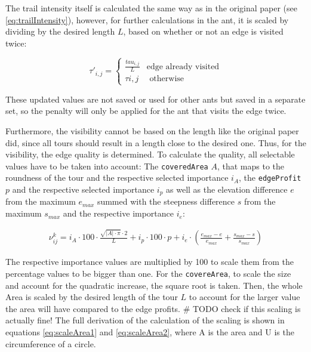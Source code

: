 The trail intensity itself is calculated the same way as in the original paper (see \ref{eq:trailIntensity}), however, for further calculations in the ant, it is scaled by dividing by the desired length $L$, based on whether or not an edge is visited twice:

\begin{equation}
	\label{eq:scaledTrailIntensity}
	\tau'_{i,j} = \begin{cases}
		 \frac{tau_{i,j}}{L} &\text{edge already visited}\\
		\tau{i,j} &\text{ otherwise}
	\end{cases}
\end{equation}

These updated values are not saved or used for other ants but saved in a separate set, so the penalty will only be applied for the ant that visits the edge twice.

Furthermore, the visibility cannot be based on the length like the original paper did, since all tours should result in a length close to the desired one.
Thus, for the visibility, the edge quality is determined.
To calculate the quality, all selectable values have to be taken into account:
The \texttt{coveredArea} $A$, that maps to the roundness of the tour and the respective selected importance $i_A$, the \texttt{edgeProfit} $p$ and the respective selected importance $i_p$ as well as the elevation difference $e$ from the maximum $e_{max}$ summed with the steepness difference $s$ from the maximum $s_{max}$ and the respective importance $i_e$:

\begin{equation}
	\label{eq:newEdgeVisibility}
	\begin{split}
	\nu_{ij}^k = i_A \cdot 100 \cdot \frac{\sqrt{|A|\cdot \pi} \cdot 2 }{L} 
	+  i_p \cdot 100 \cdot p
	+ i_e \cdot \left(\frac{e_{max} - e}{e_{max}} + \frac{s_{max} - s}{s_{max}}\right)
	\end{split}
\end{equation}

The respective importance values are multiplied by 100 to scale them from the percentage values to be bigger than one. 
For the \texttt{covereArea}, to scale the size and account for the quadratic increase, the square root is taken. 
Then, the whole Area is scaled by the desired length of the tour $L$ to account for the larger value the area will have compared to the edge profits. \# TODO check if this scaling is actually fine!
The full derivation of the calculation of the scaling is shown in equations \ref{eq:scaleArea1} and \ref{eq:scaleArea2}, where A is the area and U is the circumference of a circle.



